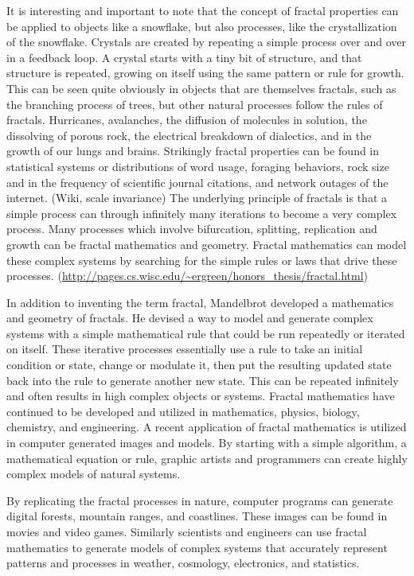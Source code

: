 \documentclass[english,jou]{apa6}
\begin{document}
It is interesting and important to note that the concept of fractal properties can be applied to objects like a snowflake, but also processes, like the crystallization of the snowflake. Crystals are created by repeating a simple process over and over in a feedback loop. A crystal starts with a tiny bit of structure, and that structure is repeated, growing on itself using the same pattern or rule for growth. This can be seen quite obviously in objects that are themselves fractals, such as the branching process of trees, but other natural processes follow the rules of fractals. Hurricanes, avalanches, the diffusion of molecules in solution, the dissolving of porous rock, the electrical breakdown of dialectics, and in the growth of our lungs and brains. Strikingly fractal properties can be found in statistical systems or distributions of word usage, foraging behaviors, rock size and in the frequency of scientific journal citations, and network outages of the internet. (Wiki, scale invariance) The underlying principle of fractals is that a simple process can through infinitely many iterations to become a very complex process. Many processes which involve bifurcation, splitting, replication and growth can be fractal mathematics and geometry. Fractal mathematics can model these complex systems by searching for the simple rules or laws that drive these processes. (\url{http://pages.cs.wisc.edu/~ergreen/honors_thesis/fractal.html})

In addition to inventing the term fractal, Mandelbrot developed a mathematics and geometry of fractals. He devised a way to model and generate complex systems with a simple mathematical rule that could be run repeatedly or iterated on itself. These iterative processes essentially use a rule to take an initial condition or state, change or modulate it, then put the resulting updated state back into the rule to generate another new state. This can be repeated infinitely and often results in high complex objects or systems. Fractal mathematics have continued to be developed and utilized in mathematics, physics, biology, chemistry, and engineering. A recent application of fractal mathematics is utilized in computer generated images and models. By starting with a simple algorithm, a mathematical equation or rule, graphic artists and programmers can create highly complex models of natural systems.

By replicating the fractal processes in nature, computer programs can generate digital forests, mountain ranges, and coastlines. These images can be found in movies and video games. Similarly scientists and engineers can use fractal mathematics to generate models of complex systems that accurately represent patterns and processes in weather, cosmology, electronics, and statistics.
\end{document}
